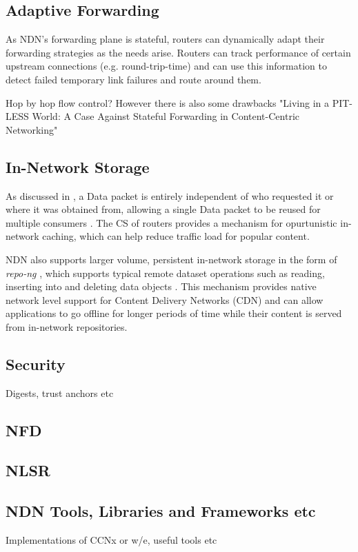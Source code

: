 \subsection*{Adaptive Forwarding}
As NDN's forwarding plane is stateful, routers can dynamically adapt their forwarding strategies as the needs arise. Routers can track performance of certain upstream connections (e.g. round-trip-time) and can use this information to detect failed temporary link failures and route around them.

Hop by hop flow control?
However there is also some drawbacks "Living in a PIT-LESS World: A Case Against
Stateful Forwarding in Content-Centric Networking"

\subsection{In-Network Storage}
As discussed in , a Data packet is entirely independent of who requested it or where it was obtained from, allowing a single Data packet to be reused for multiple consumers \cite{ndn}. The CS of routers provides a mechanism for opurtunistic in-network caching, which can help reduce traffic load for popular content. 

NDN also supports larger volume, persistent in-network storage in the form of \textit{repo-ng} \cite{ndn-repo}, which supports typical remote dataset operations such as reading, inserting into and deleting data objects \cite{ndn-repo-homepage}. This mechanism provides native network level support for Content Delivery Networks (CDN) \cite{ndn} and can allow applications to go offline for longer periods of 
time while their content is served from in-network repositories.


\subsection{Security}
Digests, trust anchors etc


\subsection{NFD}


\subsection{NLSR}\label{sec:NLSR}


\subsection{NDN Tools, Libraries and Frameworks etc}
Implementations of CCNx or w/e, useful tools etc

